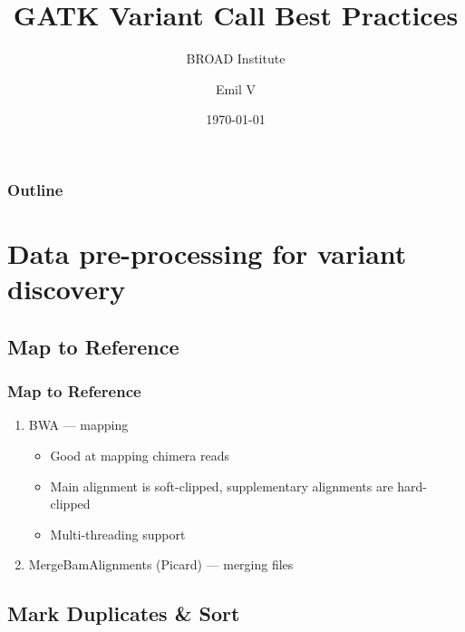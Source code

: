 \documentclass{beamer}
\title{GATK Variant Call Best Practices}
\subtitle{BROAD Institute}
\author{Emil V}
\institute{Institute of Cytology \& Genetics, SB RAS}
\date{\today}
\begin{document}
\begin{frame}
\titlepage
\end{frame}

\begin{frame}
\frametitle{Outline}
\tableofcontents
\end{frame}

\section{Data pre-processing for variant discovery}

\subsection{Map to Reference}

\begin{frame}
\frametitle{Map to Reference}

\begin{enumerate}
\item BWA --- mapping
\begin{itemize}
\item Good at mapping chimera reads
\item Main alignment is soft-clipped, supplementary alignments are hard-clipped
\item Multi-threading support 
\end{itemize}
\item MergeBamAlignments (Picard) --- merging files
\end{enumerate}

\end{frame}

\subsection{Mark Duplicates \& Sort}
\end{document}
